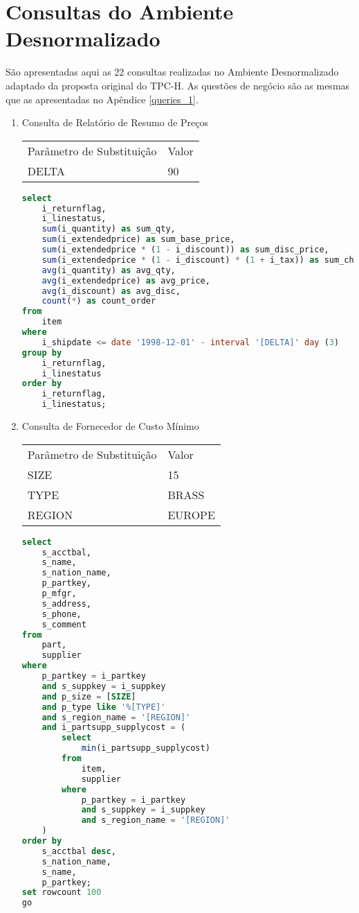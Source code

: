 
\chapter{Consultas do Ambiente Desnormalizado}
\label{queries_2}


São apresentadas aqui as 22 consultas realizadas no Ambiente Desnormalizado adaptado da proposta original do TPC-H. As questões de negócio são as mesmas que as apresentadas no Apêndice \ref{queries_1}.

\begin{enumerate}

\item Consulta de Relatório de Resumo de Preços 

	\begin{tabular}{ll}
	Parâmetro de Substituição & Valor\\
	DELTA & 90\\
\end{tabular}
	
	\begin{lstlisting}[language=SQL]
select
    i_returnflag,
    i_linestatus,
    sum(i_quantity) as sum_qty,
    sum(i_extendedprice) as sum_base_price,
    sum(i_extendedprice * (1 - i_discount)) as sum_disc_price,
    sum(i_extendedprice * (1 - i_discount) * (1 + i_tax)) as sum_charge,
    avg(i_quantity) as avg_qty,
    avg(i_extendedprice) as avg_price,
    avg(i_discount) as avg_disc,
    count(*) as count_order
from
    item
where
    i_shipdate <= date '1998-12-01' - interval '[DELTA]' day (3)
group by
    i_returnflag,
    i_linestatus
order by
    i_returnflag,
    i_linestatus;
	\end{lstlisting}

\item Consulta de Fornecedor de Custo Mínimo
	
	\begin{tabular}{ll}
	Parâmetro de Substituição & Valor\\
	SIZE & 15\\
	TYPE & BRASS\\
	REGION & EUROPE\\
\end{tabular}

	\begin{lstlisting}[language=SQL]
select
    s_acctbal,
    s_name,
    s_nation_name,
    p_partkey,
    p_mfgr,
    s_address,
    s_phone,
    s_comment
from
    part,
    supplier
where
    p_partkey = i_partkey
    and s_suppkey = i_suppkey
    and p_size = [SIZE]
    and p_type like '%[TYPE]'
    and s_region_name = '[REGION]'
    and i_partsupp_supplycost = (
        select
            min(i_partsupp_supplycost)
        from
            item,
            supplier
        where
            p_partkey = i_partkey
            and s_suppkey = i_suppkey
            and s_region_name = '[REGION]'
    )
order by
    s_acctbal desc,
    s_nation_name,
    s_name,
    p_partkey;
set rowcount 100
go
	\end{lstlisting}


\end{enumerate}
